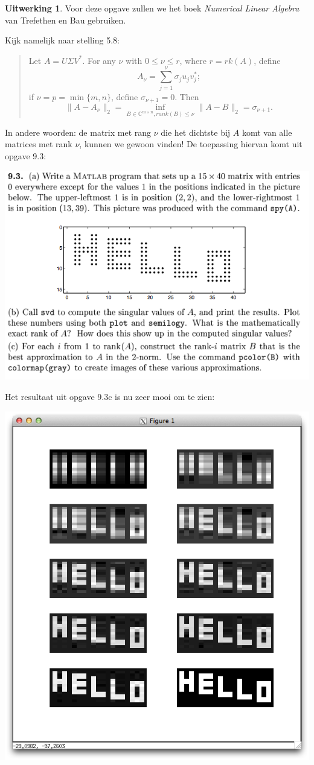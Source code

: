 \documentclass[11pt]{amsart}
\theoremstyle{definition}
\newtheorem*{uitwerking}{Uitwerking}
\newcommand{\C}{\mathbb{C}}
\begin{document}
\begin{uitwerking}
  Voor deze opgave zullen we het boek \emph{Numerical Linear Algebra} van Trefethen en Bau gebruiken.

  Kijk namelijk naar stelling 5.8:
  \begin{quote}
    Let $A = U \Sigma V^*$. For any $\nu$ with $0 \leq \nu \leq r$, where $r = rk(A)$, define
    \[
      A_\nu = \sum_{j=1}^\nu \sigma_j u_j v_j^*; 
    \]
    if $\nu = p = \min{\{m,n\}}$, define $\sigma_{\nu + 1} = 0$. Then
  \[
    \| A - A_\nu \|_2 = \inf_{B \in \C^{m \times n}, rank(B) \leq \nu} \| A - B \|_2 = \sigma_{\nu + 1}.
  \]
  \end{quote}
  In andere woorden: de matrix met rang $\nu$ die het dichtste bij $A$ komt van alle matrices met rank $\nu$, kunnen we gewoon vinden! De toepassing hiervan komt uit opgave 9.3:

  \includegraphics[width=\textwidth]{bla.png}

  Het resultaat uit opgave 9.3c is nu zeer mooi om te zien:

  \includegraphics[width=\textwidth]{opg9_3c.png}

\end{uitwerking}
\end{document}
